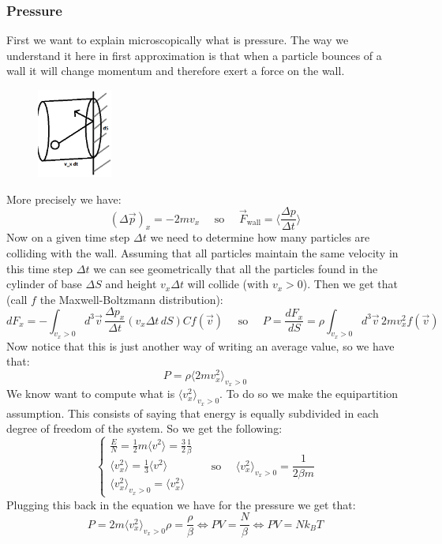 \documentclass[10pt,a4paper]{book}
\begin{document}
\subsubsection{Pressure}
First we want to explain microscopically what is pressure. The way we understand it here in first approximation is that when a particle bounces of a wall it will change momentum and therefore exert a force on the wall.
\begin{figure}
  \begin{center}
    \includegraphics[width=0.22\textwidth]{graphs/PressureDiag}
  \end{center}
\end{figure}
More precisely we have:
\[
(\Delta \vec{p})_x = -2 m v_x \quad \text{ so } \quad \vec{F}_\text{wall} = \langle\frac{\Delta p}{\Delta t}\rangle
\]
Now on a given time step $\Delta t$ we need to determine how many particles are colliding with the wall. Assuming that all particles maintain the same velocity in this time step $\Delta t$ we can see geometrically that all the particles found in the cylinder of base $\Delta S$ and height $v_x\Delta t$ will collide (with $v_x > 0$).
Then we get that (call $f$ the Maxwell-Boltzmann distribution):
\[
dF_x = -\int_{v_x > 0} d^3\vec{v}\, \frac{\Delta p_x}{\Delta t}(v_x \Delta t \, dS) C f(\vec{v}) \quad \text{ so } \quad P = \frac{dF_x}{dS} = \rho \int_{v_x > 0} d^3 \vec{v}\, 2mv_x^2 f(\vec{v})
\]
Now notice that this is just another way of writing an average value, so we have that:
\[
P = \rho \langle 2m v_x^2 \rangle_{v_x > 0}
\]
We know want to compute what is $\langle v_x^2 \rangle_{v_x > 0}$. To do so we make the equipartition assumption. This consists of saying that energy is equally subdivided in each degree of freedom of the system. So we get the following:
\[
\begin{cases}
\frac{E}{N} = \frac{1}{2}m \langle v^2 \rangle = \frac{3}{2}\frac{1}{\beta}\\
\langle v_x^2 \rangle = \frac{1}{3} \langle v^2 \rangle\\
\langle v_x^2 \rangle_{v_x > 0} = \langle v_x^2 \rangle 
\end{cases}
\quad  \text{ so } \quad \langle v_x^2\rangle_{v_x > 0} = \frac{1}{2\beta m}
\]
Plugging this back in the equation we have for the pressure we get that:
\[
P = 2m\langle v_x^2 \rangle_{v_x > 0} \rho = \frac{\rho}{\beta} \Leftrightarrow PV = \frac{N}{\beta} \Leftrightarrow PV = Nk_B T
\]
\end{document}
